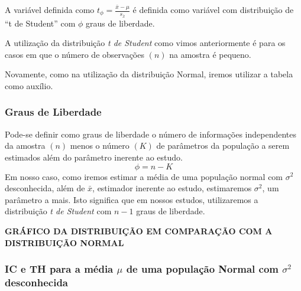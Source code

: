 \documentclass[oneside,a4paper,12pt]{article}
\begin{document}
A variável definida como $t_{\phi} = \displaystyle \frac{\bar{x} - \mu}{s_{\bar{x}}}$ é definida como variável com distribuição de ``t de Student'' com $\phi$ graus de liberdade.

A utilização da distribuição \emph{t de Student} como vimos anteriormente é para os casos em que o número de observações $(n)$ na amostra é pequeno.

Novamente, como na utilização da distribuição Normal, iremos utilizar a tabela como auxílio.

\subsubsection{Graus de Liberdade}
Pode-se definir como graus de liberdade o número de informações independentes da amostra $(n)$ menos o número $(K)$ de parâmetros da população a serem estimados além do parâmetro inerente ao estudo.
$$\phi = n - K$$
Em nosso caso, como iremos estimar a média de uma população normal com $\sigma^2$ desconhecida, além de $\bar{x}$, estimador inerente ao estudo, estimaremos $\sigma^2$, um parâmetro a mais. Isto significa que em nossos estudos, utilizaremos a distribuição \emph{t de Student} com $n - 1$ graus de liberdade.

\textbf{GRÁFICO DA DISTRIBUIÇÃO EM COMPARAÇÃO COM A DISTRIBUIÇÃO NORMAL}

\subsubsection{IC e TH para a média $\mu$ de uma população Normal com $\sigma^2$ desconhecida}
\end{document}
